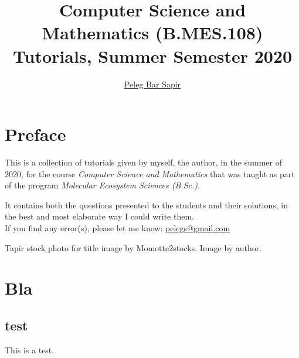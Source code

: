 \documentclass[a4paper]{report}
\title{Computer Science and Mathematics (B.MES.108)\\Tutorials, Summer Semester 2020\\}
\author{\href{mailto:pelegs@gmail.com}{Peleg Bar Sapir}}
\begin{document}
\maketitle

\chapter*{Preface}
This is a collection of tutorials given by myself, the author, in the summer of 2020, for the course \textit{Computer Science and Mathematics} that was taught as part of the program \textit{Molecular Ecosystem Sciences (B.Sc.)}.

It contains both the questions presented to the students and their solutions, in the best and most elaborate way I could write them.
~\\

If you find any error(s), please let me know: \href{mailto:pelegs@gmail.com}{pelegs@gmail.com}

\vspace{6cm} Tapir stock photo for title image by Momotte2stocks. Image by author.

\setcounter{secnumdepth}{0}
\setcounter{tocdepth}{1}
\tableofcontents

\chapter{Bla}
\newpage

\section{test}
This is a test.
\end{document}
